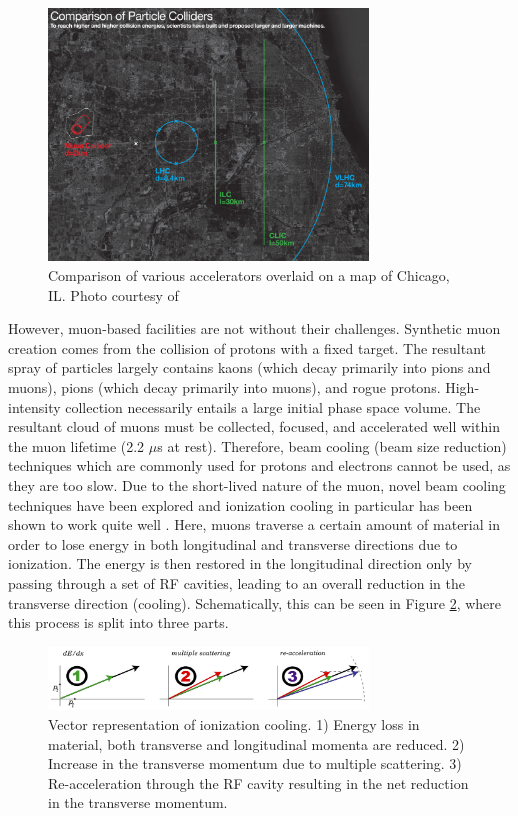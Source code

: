 \documentclass{jacow}
\begin{document}
\begin{figure}[h!] 
\centering
\includegraphics*[width=85mm]{Figures/Collider_Comparison_Map}
\caption{Comparison of various accelerators overlaid on a map of Chicago, IL. Photo courtesy of \cite{fermilab}}
\label{fig:collider_comparison}
\end{figure}

However, muon-based facilities are not without their challenges. Synthetic muon creation comes from the collision of protons with a fixed target. The resultant spray of particles largely contains kaons (which decay primarily into pions and muons), pions (which decay primarily into muons), and rogue protons. High-intensity collection necessarily entails a large initial phase space volume. The resultant cloud of muons must be collected, focused, and accelerated well within the muon lifetime (2.2 $\mu$s at rest). Therefore, beam cooling (beam size reduction) techniques which are commonly used for protons and electrons cannot be used, as they are too slow. Due to the short-lived nature of the muon, novel beam cooling techniques have been explored and ionization cooling in particular has been shown to work quite well \cite{Parkhomchuk}. Here, muons traverse a certain amount of material in order to lose energy in both longitudinal and transverse directions due to ionization. The energy is then restored in the longitudinal direction only by passing through a set of RF cavities, leading to an overall reduction in the transverse direction (cooling). Schematically, this can be seen in Figure \ref{fig:cooling_vector}, where this process is split into three parts.

\begin{figure}[h!] 
\centering
\includegraphics*[width=85mm]{Figures/cooling_vector}
\caption{Vector representation of ionization cooling. 1) Energy loss in material, both transverse and longitudinal momenta are reduced. 2) Increase in the transverse momentum due to multiple scattering.  3) Re-acceleration through the RF cavity resulting in the net reduction in the transverse momentum.}
\label{fig:cooling_vector}
\end{figure}
\end{document}
